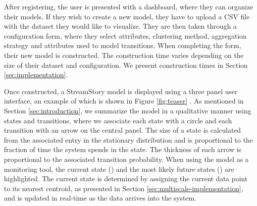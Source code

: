 
\iffalse
Features  
\begin{itemize}
	\item Qualitative representation - states and transitions
	\item State identification services:
	\begin{itemize}
		\item State details and attribute highlighting - histograms + attribute colors
		\item \lstopar{Timeline + parallel coordinates \cite{parcoords} - when do states occur in time}
		\item \lstopar{Coloring states based on attributes}
		\item Decision trees + rule extraction - Explanation of states
		\item Automatic name generation
		\item Zooming into a state + showing paths from a state
	\end{itemize}
\end{itemize}
\fi

After registering, the user is presented with a dashboard, where they can organize their models.
If they wish to create a new model, they have to upload a CSV file with the dataset they would
like to visualize. They are then taken through a configuration form, where they select attributes,
clustering method, aggregation strategy and attributes used to model transitions. When completing
the form, their new model is constructed. The construction time varies depending on the size of 
their dataset and configuration. We present construction times in Section \ref{sec:implementation}.

Once constructed, a StreamStory model is displayed using a three panel user interface, an example of
which is shown in Figure \ref{fig:teaser} . As mentioned
in Section \ref{sec:introduction}, we summarize the model in a qualitative manner using states and 
transitions, where we associate each state with a circle and each transition with an arrow on the 
central panel. The size of a state is calculated from the associated entry in the stationary distribution
and is proportional to the fraction of time the system spends in the state. The thickness of each arrow
is proportional to the associated transition probability. When using the model as a
monitoring tool, the current state () and the most likely future states ()
are highlighted. The current state is determined by assigning the current data point to its nearest 
centroid, as presented in Section \ref{sec:multiscale-implementation}, and is updated in real-time as
the data arrives into the system.

